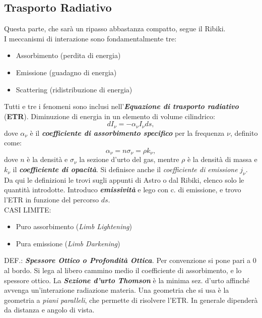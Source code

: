 \subsection*{Trasporto Radiativo}
Questa parte, che sarà un ripasso abbastanza compatto, segue il Ribiki.\\
I meccanismi di interazione sono fondamentalmente tre:
\begin{itemize}
    \item Assorbimento  (perdita di energia)
    \item Emissione     (guadagno di energia)
    \item Scattering    (ridistribuzione di energia)
\end{itemize}
Tutti e tre i fenomeni sono inclusi nell'\textbf{\textit{Equazione di trasporto radiativo}} (\textbf{ETR}).
Diminuzione di energia in un elemento di volume cilindrico:
\begin{equation}
    dI_{\nu} = - \alpha_{\nu}I_{\nu}ds,
\end{equation}
dove $\alpha_{\nu}$ è il \textbf{\textit{coefficiente di assorbimento specifico}} per la frequenza $\nu$, definito come:
\begin{equation}
    \alpha_{\nu} = n\sigma_{\nu} = \rho k_{\nu},
\end{equation}
dove $n$ è la densità e $\sigma_{\nu}$ la sezione d'urto del gas, mentre $\rho$ è la densità di massa e $k_{\nu}$ il \textbf{\textit{coefficiente di opacità}}.
Si definisce anche il \textit{coefficiente di emissione} $j_{\nu}$.\\
Da qui le definizioni le trovi sugli appunti di Astro o dal Ribiki, elenco solo le quantità introdotte.
Introduco \textbf{\textit{emissività}} e lego con c. di emissione, e trovo l'ETR in funzione del percorso $ds$.\\
CASI LIMITE:
\begin{itemize}
    \item Puro assorbimento (\textit{Limb Lightening})
    \item Pura emissione (\textit{Limb Darkening})
\end{itemize}
DEF.: \textit{\textbf{Spessore Ottico o Profondità Ottica}.}
Per convenzione si pone pari a 0 al bordo. 
Si lega al libero cammino medio il coefficiente di assorbimento, e lo spessore ottico.
La \textbf{\textit{Sezione d'urto Thomson}} è la minima sez. d'urto affinché avvenga un'interazione radiazione materia.
Una geometria che si usa è la geometria a \textit{piani paralleli}, che permette di risolvere l'ETR. 
In generale dipenderà da distanza e angolo di vista.
